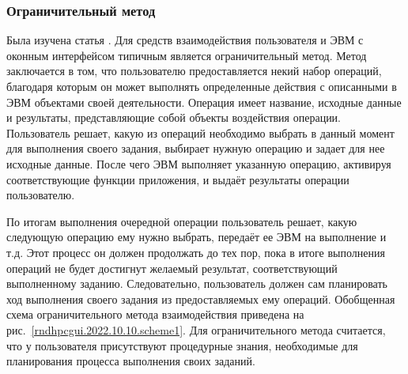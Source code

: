 \def\notedate{2022.10.10}
\def\currentauthor{Василян А.Р. (РК6-73Б)}

\subsubsection{Ограничительный метод}
	
Была изучена статья \cite{Sankovsky1998}. Для средств взаимодействия пользователя и ЭВМ с оконным интерфейсом типичным является ограничительный метод. Метод заключается в том, что пользователю предоставляется некий набор операций, благодаря которым он может выполнять определенные действия с описанными в ЭВМ объектами своей деятельности. Операция имеет название, исходные данные и результаты, представляющие собой объекты воздействия операции. Пользователь решает, какую из операций необходимо выбрать в данный момент для выполнения своего задания, выбирает нужную операцию и задает для нее исходные данные. После чего ЭВМ выполняет указанную операцию, активируя соответствующие функции приложения, и выдаёт результаты операции пользователю. 
	
	
По итогам выполнения очередной операции пользователь решает, какую следующую операцию ему нужно выбрать, передаёт ее ЭВМ на выполнение и т.д. Этот процесс он должен продолжать до тех пор, пока в итоге выполнения операций не будет достигнут желаемый результат, соответствующий выполненному заданию. Следовательно, пользователь должен сам планировать ход выполнения своего задания из предоставляемых ему операций. Обобщенная схема ограничительного метода взаимодействия приведена на рис.~\ref{rndhpcgui.2022.10.10.scheme1}. Для ограничительного метода считается, что у пользователя присутствуют процедурные знания, необходимые для планирования процесса выполнения своих заданий.

